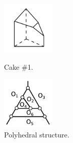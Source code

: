\documentclass[suppldata, dvipdfmx]{interact}
\theoremstyle{plain}%
\theoremstyle{definition}
\theoremstyle{remark}
\theoremstyle{problemstyle}
\begin{document}
\begin{figure}[h!tbp]
  \begin{minipage}[t]{0.5\textwidth}
   \centering
   \includegraphics[width=1in,
   keepaspectratio]{./img/HexahedraWithSphericalFaces/hexahedralCake1/cake1.jpg}
   \caption{Cake \#1.}
   \label{fig:cake1}
  \end{minipage}
 \hspace*{\fill}
  \begin{minipage}[t]{0.5\textwidth}
   \centering
   \includegraphics[width=1in, keepaspectratio]{./img/HexahedraWithSphericalFaces/hexahedralCake1/faces.jpg}
   \caption{Polyhedral structure.}
   \label{fig:hexahedralCake1Graph}
  \end{minipage}
\end{figure}
\end{document}
